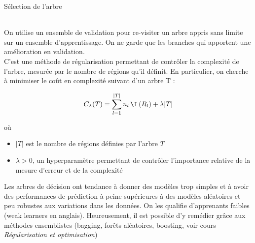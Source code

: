 \documentclass[10pt]{beamer}
\newcommand{\hsp}{\hspace*{1em}}
\begin{document}
\begin{frame}{Sélection de l'arbre }
	
	\\[2em]
	
	On utilise un ensemble de validation pour re-visiter un arbre appris
	sans limite sur un ensemble d’apprentissage. On ne garde que les
	branches qui apportent une amélioration en validation. \\[1em]
	
	C'est une méthode de régularisation permettant de contrôler la complexité de l’arbre, mesurée par le nombre de régions qu’il définit. En particulier, on cherche à minimiser le coût en complexité suivant d'un arbre T :
	
	$$C_\lambda(T) = \sum_{l=1}^{|T|} n_l \,  \I\left(R_l\right) + \lambda |T| $$
	
	où
	\begin{itemize}
		\item $|T|$ est le nombre de régions définies par l'arbre $T$\\[0.5em]
	\item $\lambda>0$, un hyperparamètre permettant de contrôler l’importance relative de la mesure d’erreur et de la complexité
\end{itemize}


\end{frame}

\begin{frame}
	
	\vspace*{4em}
		\warning \hsp Les arbres de décision ont tendance à donner des modèles trop simples et à avoir des performances de prédiction à peine supérieures à des modèles aléatoires et peu robustes aux variations dans les données. On les qualifie d’apprenants faibles (weak learners en anglais). Heureusement, il est possible d’y remédier grâce aux méthodes ensemblistes (bagging, forêts aléatoires, boosting, voir cours \textit{Régularisation et optimisation})


\end{frame}
\end{document}
